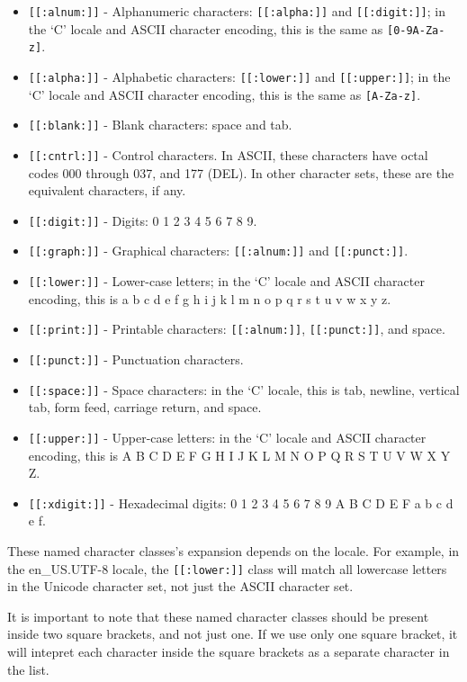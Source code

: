 \begin{itemize}
  \item \lstinline|[[:alnum:]]| - Alphanumeric characters: \lstinline|[[:alpha:]]| and \lstinline|[[:digit:]]|; in the ‘C’ locale and ASCII character encoding, this is the same as \lstinline|[0-9A-Za-z]|.
  \item \lstinline|[[:alpha:]]| - Alphabetic characters: \lstinline|[[:lower:]]| and \lstinline|[[:upper:]]|; in the ‘C’ locale and ASCII character encoding, this is the same as \lstinline|[A-Za-z]|.
  \item \lstinline|[[:blank:]]| - Blank characters: space and tab.
  \item \lstinline|[[:cntrl:]]| - Control characters. In ASCII, these characters have octal codes 000 through 037, and 177 (DEL). In other character sets, these are the equivalent characters, if any.
  \item \lstinline|[[:digit:]]| - Digits: 0 1 2 3 4 5 6 7 8 9.
  \item \lstinline|[[:graph:]]| - Graphical characters: \lstinline|[[:alnum:]]| and \lstinline|[[:punct:]]|.
  \item \lstinline|[[:lower:]]| - Lower-case letters; in the ‘C’ locale and ASCII character encoding, this is a b c d e f g h i j k l m n o p q r s t u v w x y z.
  \item \lstinline|[[:print:]]| - Printable characters: \lstinline|[[:alnum:]]|, \lstinline|[[:punct:]]|, and space.
  \item \lstinline|[[:punct:]]| - Punctuation characters.
  \item \lstinline|[[:space:]]| - Space characters: in the ‘C’ locale, this is tab, newline, vertical tab, form feed, carriage return, and space.
  \item \lstinline|[[:upper:]]| - Upper-case letters: in the ‘C’ locale and ASCII character encoding, this is A B C D E F G H I J K L M N O P Q R S T U V W X Y Z.
  \item \lstinline|[[:xdigit:]]| - Hexadecimal digits: 0 1 2 3 4 5 6 7 8 9 A B C D E F a b c d e f.
\end{itemize}

These named character classes's expansion depends on the locale. For example, in the en\_US.UTF-8 locale, the \lstinline|[[:lower:]]| class will match all lowercase letters in the Unicode character set, not just the ASCII character set.

It is important to note that these named character classes should be present
inside two square brackets, and not just one. If we use only one square bracket,
it will intepret each character inside the square brackets as a separate character
in the list.

